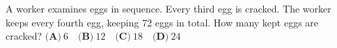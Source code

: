 A worker examines eggs in sequence. Every third egg is cracked. The worker keeps every fourth egg, keeping 72 eggs in total. How many kept eggs are cracked? $\textbf{(A)}\ 6\quad\textbf{(B)}\ 12\quad\textbf{(C)}\ 18\quad\textbf{(D)}\ 24$
